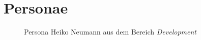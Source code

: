 \clearpage

\section{Personae}
\label{sec:anhang-personae}

\begin{figure}[!htb]
    \centering
    \caption{Persona Heiko Neumann aus dem Bereich \textit{Development}}
    \label{fig:persona-development}
\end{figure}

